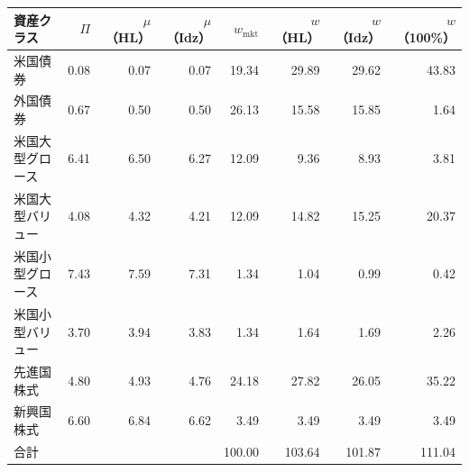 \begin{tabular}{lrrrrrrr}
\toprule
資産クラス & $\Pi$ & $\mu$（HL） & $\mu$（Idz） & $w_{\mathrm{mkt}}$ & $w$（HL） & $w$（Idz） & $w$（100\%） \\
\midrule
米国債券 & 0.08 & 0.07 & 0.07 & 19.34 & 29.89 & 29.62 & 43.83 \\
外国債券 & 0.67 & 0.50 & 0.50 & 26.13 & 15.58 & 15.85 & 1.64 \\
米国大型グロース & 6.41 & 6.50 & 6.27 & 12.09 & 9.36 & 8.93 & 3.81 \\
米国大型バリュー & 4.08 & 4.32 & 4.21 & 12.09 & 14.82 & 15.25 & 20.37 \\
米国小型グロース & 7.43 & 7.59 & 7.31 & 1.34 & 1.04 & 0.99 & 0.42 \\
米国小型バリュー & 3.70 & 3.94 & 3.83 & 1.34 & 1.64 & 1.69 & 2.26 \\
先進国株式 & 4.80 & 4.93 & 4.76 & 24.18 & 27.82 & 26.05 & 35.22 \\
新興国株式 & 6.60 & 6.84 & 6.62 & 3.49 & 3.49 & 3.49 & 3.49 \\
\midrule
合計 &  &  &  & 100.00 & 103.64 & 101.87 & 111.04 \\
\bottomrule
\end{tabular}
